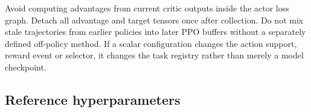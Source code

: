 \documentclass[10pt,a4paper]{article}
\begin{document}
\endgroup

Avoid computing advantages from current critic outputs inside the actor
loss graph. Detach all advantage and target tensors once after
collection. Do not mix stale trajectories from earlier policies into
later PPO buffers without a separately defined off-policy method. If a
scalar configuration changes the action support, reward event or
selector, it changes the task registry rather than merely a model
checkpoint.

\hypertarget{reference-hyperparameters}{%
\subsection{Reference hyperparameters}\label{reference-hyperparameters}}

\begingroup\small
\end{document}
